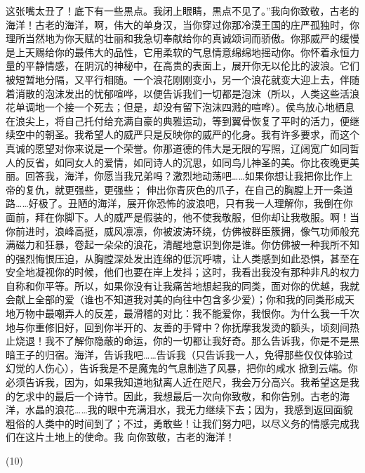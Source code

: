\documentclass{article}
\begin{document}
\newpage
这张嘴太丑了！底下有一些黒点。我闭上眼睛，黒点不见了。”我向你致敬，古老的海洋！古老的海洋，啊，伟大的单身汉，当你穿过你那冷漠王国的庄严孤独时，你理所当然地为你天赋的壮丽和我急切奉献给你的真诚颂词而骄傲。你那威严的缓慢是上天赐给你的最伟大的品性，它用柔软的气息情意绵绵地摇动你。你怀着永恒力量的平静情感，在阴沉的神秘中，在高贵的表面上，展开你无以伦比的波浪。它们被短暂地分隔，又平行相随。一个浪花刚刚变小，另一个浪花就变大迎上去，伴随着消散的泡沫发出的忧郁喧哗，以便告诉我们一切都是泡沫（所以，人类这些活浪花单调地一个接一个死去；但是，却没有留下泡沫四溅的喧哗）。侯鸟放心地栖息在浪尖上，将自己托付给充满自豪的典雅运动，等到翼骨恢复了平时的活力，便继续空中的朝圣。我希望人的威严只是反映你的威严的化身。我有许多要求，而这个真诚的愿望对你来说是一个荣誉。你那道德的伟大是无限的写照，辽阔宽广如同哲人的反省，如同女人的爱情，如同诗人的沉思，如同鸟儿神圣的美。你比夜晚更美丽。回答我，海洋，你愿当我兄弟吗？激烈地动荡吧……如果你想让我把你比作上帝的复仇，就更强些，更强些；
\newpage
伸出你青灰色的爪子，在自己的胸膛上开一条道路……好极了。丑陋的海洋，展开你恐怖的波浪吧，只有我一人理解你，我倒在你面前，拜在你脚下。人的威严是假装的，他不使我敬服，但你却让我敬服。啊！当你前进时，浪峰高挺，威风凛凛，你被波涛环绕，仿佛被群臣簇拥，像气功师般充满磁力和狂暴，卷起一朵朵的浪花，清醒地意识到你是谁。你仿佛被一种我所不知的强烈悔恨压迫，从胸膛深处发出连绵的低沉呼啸，让人类感到如此恐惧，甚至在安全地凝视你的时候，他们也要在岸上发抖；这时，我看出我没有那种非凡的权力自称和你平等。所以，如果你没有让我痛苦地想起我的同类，面对你的优越，我就会献上全部的爱（谁也不知道我对美的向往中包含多少爱）；你和我的同类形成天地万物中最嘲弄人的反差，最滑稽的对比：我不能爱你，我恨你。为什么我一千次地与你重修旧好，回到你半开的、友善的手臂中？你抚摩我发烫的额头，顷刻间热止烧退！我不了解你隐蔽的命运，你的一切都让我好奇。那么告诉我，你是不是黑暗王子的归宿。海洋，告诉我吧……告诉我（只告诉我一人，免得那些仅仅体验过幻觉的人伤心），告诉我是不是魔鬼的气息制造了风暴，把你的咸水
\newpage
掀到云端。你必须告诉我，因为，如果我知道地狱离人近在咫尺，我会万分高兴。我希望这是我的乞求中的最后一个诗节。因此，我想最后一次向你致敬，和你告别。古老的海洋，水晶的浪花……我的眼中充满泪水，我无力继续下去；因为，我感到返回面貌粗俗的人类中的时间到了；不过，勇敢些！让我们努力吧，以尽义务的情感完成我们在这片土地上的使命。我
向你致敬，古老的海洋！ 


(10) 
\end{document}
